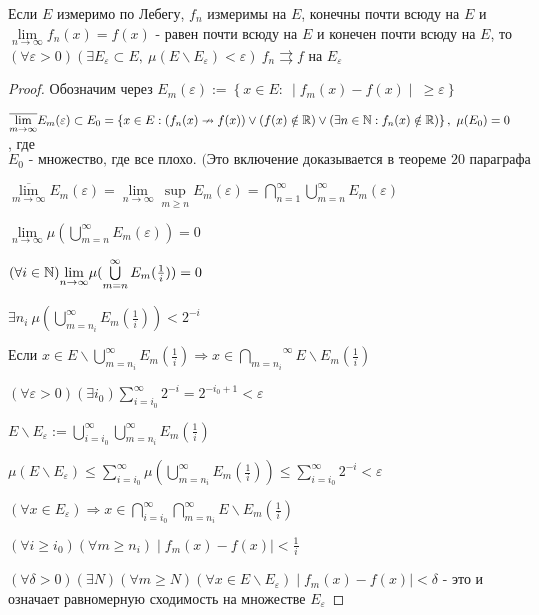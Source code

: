 \begin{theorem}[Д. Ф. Егоров]
    Если $E$ измеримо по Лебегу, $f_n$ измеримы на $E$, конечны почти всюду на $E$ и $\lim\limits_{n\to\infty} f_n(x)=f(x)$ - равен почти всюду на $E$ и конечен почти всюду на $E$, то ${(\forall \varepsilon >0)(\exists E_{\varepsilon}\subset E,\ \mu (E\backslash E_{\varepsilon})<\varepsilon)\ f_n \rightrightarrows f}$ на $E_{\varepsilon}$
\end{theorem}
\begin{proof}
Обозначим через $E_m(\varepsilon):=\left\{x\in E:\ \mid f_m(x)-f(x)\mid\ \geqslant \varepsilon \right\}$

${\overline{\lim\limits_{m\to\infty}}E_m(\varepsilon) \subset E_0=\left\{x\in E:(f_n(x)\nrightarrow f(x)) \vee (f(x) \notin \R) \vee (\exists n\in \N:f_n(x)\notin \R) \right\},\ \mu(E_0)=0}$, где $E_0\text{ - множество, где все плохо. (Это включение доказывается в теореме 20 параграфа 5).}$

$\overline{\lim\limits_{m\to\infty}}E_m(\varepsilon) =\lim\limits_{n\to\infty}\sup\limits_{m\geqslant n} E_m(\varepsilon)=\bigcap\limits_{n=1}^{\infty}\bigcup\limits_{m=n}^{\infty}E_m(\varepsilon)$

$\lim\limits_{n\to\infty}\mu(\bigcup\limits_{m=n}^{\infty}E_m(\varepsilon))=0$

$(\forall i \in \N) {\lim\limits_{n\to\infty}} \mu(\bigcup\limits_{m=n}^{\infty}E_m(\frac{1}{i}))=0$

$\exists n_i\ \mu(\bigcup\limits_{m=n_i}^{\infty}E_m(\frac{1}{i}))<2^{-i}$

$\text{Если }x \in E \backslash {\bigcup\limits_{m=n_i}^\infty}E_m(\frac{1}{i}) \Rightarrow x \in \overset{\infty}{\underset{m=n_i}{\bigcap}}E\backslash E_m(\frac{1}{i})$

$(\forall \varepsilon >0)(\exists i_0) \sum\limits_{i=i_0}^{\infty}2^{-i}=2^{-i_0+1}<\varepsilon$

$E\backslash E_{\varepsilon}:=\bigcup\limits_{i=i_0}^{\infty}\bigcup\limits_{m=n_i}^{\infty}E_m(\frac{1}{i})$

$\mu(E\backslash E_{\varepsilon})\leqslant \sum\limits_{i=i_0}^{\infty}\mu(\bigcup\limits_{m=n_i}^{\infty}E_m(\frac{1}{i}))\leqslant \sum\limits_{i=i_0}^{\infty}2^{-i}<\varepsilon$

$(\forall x \in E_{\varepsilon}) \Rightarrow x \in \bigcap\limits_{i=i_0}^{\infty}\bigcap\limits_{m=n_i}^{\infty}E\backslash E_m (\frac{1}{i})$

$(\forall i \geqslant i_0)(\forall m \geqslant n_i) \mid f_m(x)-f(x) \mid < \frac{1}{i}$

$(\forall \delta > 0)(\exists N)(\forall m \geqslant N)(\forall x \in E \backslash E_{\varepsilon}) \mid f_m(x)-f(x) \mid < \delta$ - это и означает равномерную сходимость на множестве $E_{\varepsilon}$
\end{proof}
